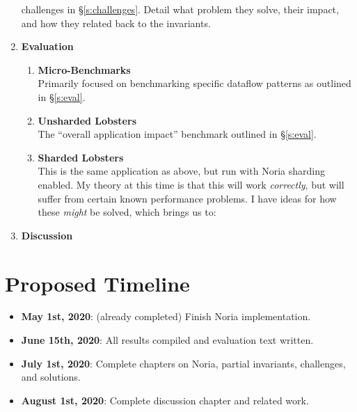 \documentclass[12pt,letterpaper,twoside]{article}
\begin{document}
\begin{enumerate}
   challenges in \S\ref{s:challenges}. Detail what problem they solve,
   their impact, and how they related back to the invariants.
 \item \textbf{Evaluation}
   \begin{enumerate}
   \item \textbf{Micro-Benchmarks}\\
     Primarily focused on benchmarking specific dataflow patterns as
     outlined in \S\ref{s:eval}.
   \item \textbf{Unsharded Lobsters}\\
     The ``overall application impact'' benchmark outlined in \S\ref{s:eval}.
   \item \textbf{Sharded Lobsters}\\
     This is the same application as above, but run with Noria sharding
     enabled. My theory at this time is that this will work \emph{correctly},
     but will suffer from certain known performance problems. I have
     ideas for how these \emph{might} be solved, which brings us to:
   \end{enumerate}
 \item \textbf{Discussion}
\end{enumerate}

\section{Proposed Timeline}

\begin{itemize}
 \item \textbf{May 1st, 2020}: (already completed) Finish Noria implementation.
 \item \textbf{June 15th, 2020}: All results compiled and evaluation text written.
 \item \textbf{July 1st, 2020}: Complete chapters on Noria, partial invariants, challenges, and solutions.
 \item \textbf{August 1st, 2020}: Complete discussion chapter and related work.
\end{itemize}

\printbibliography
\end{document}
